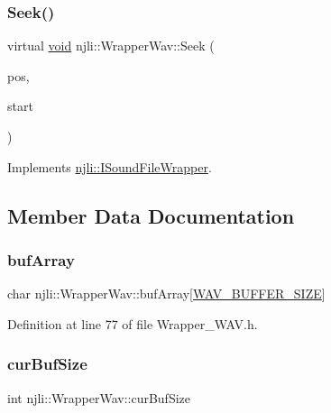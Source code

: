 \subsubsection{\texorpdfstring{Seek()}{Seek()}}
{\footnotesize\ttfamily virtual \mbox{\hyperlink{_thread_8h_af1e856da2e658414cb2456cb6f7ebc66}{void}} njli\+::\+Wrapper\+Wav\+::\+Seek (\begin{DoxyParamCaption}\item[{size\+\_\+t}]{pos,  }\item[{\mbox{\hyperlink{classnjli_1_1_i_sound_file_wrapper_ab4b07720cb2823b4f3f9fa98ee07a6e7}{S\+E\+E\+K\+\_\+\+P\+OS}}}]{start }\end{DoxyParamCaption})\hspace{0.3cm}{\ttfamily [virtual]}}



Implements \mbox{\hyperlink{classnjli_1_1_i_sound_file_wrapper_a22241a77b7d6adf55045a7a30ec5ef30}{njli\+::\+I\+Sound\+File\+Wrapper}}.



\subsection{Member Data Documentation}
\mbox{\label{classnjli_1_1_wrapper_wav_a9b66f4b65280f952349f526c7012e9b8}} 
\subsubsection{\texorpdfstring{buf\+Array}{bufArray}}
{\footnotesize\ttfamily char njli\+::\+Wrapper\+Wav\+::buf\+Array\mbox{[}\mbox{\hyperlink{_wrapper___w_a_v_8h_a9a6da6d572cf36f4c8df9df32f289291}{W\+A\+V\+\_\+\+B\+U\+F\+F\+E\+R\+\_\+\+S\+I\+ZE}}\mbox{]}\hspace{0.3cm}{\ttfamily [private]}}



Definition at line 77 of file Wrapper\+\_\+\+W\+A\+V.\+h.

\mbox{\label{classnjli_1_1_wrapper_wav_a4915a4654f047eedb569dbe03b73f1f6}} 
\subsubsection{\texorpdfstring{cur\+Buf\+Size}{curBufSize}}
{\footnotesize\ttfamily int njli\+::\+Wrapper\+Wav\+::cur\+Buf\+Size\hspace{0.3cm}{\ttfamily [private]}}



